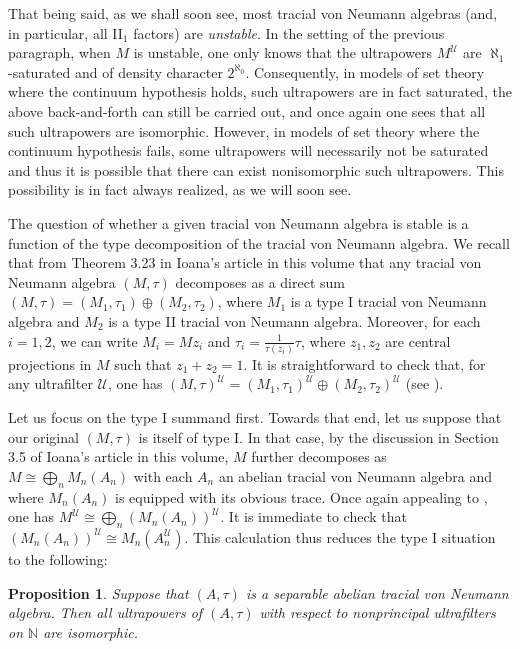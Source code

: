 \documentclass[12pt]{amsart}
\newtheorem{prop}[thm]{Proposition}
\theoremstyle{definition}
\def\bb{\mathbb}
\def\bb{\mathbb}
\def\u{\mathsf 1}
\def \u{\mathcal U}
\begin{document}
That being said, as we shall soon see, most tracial von Neumann algebras (and, in particular, all II$_1$ factors) are \emph{unstable}.   In the setting of the previous paragraph, when $M$ is unstable, one only knows that the ultrapowers $M^\u$ are $\aleph_1$-saturated and of density character $2^{\aleph_0}$.  Consequently, in models of set theory where the continuum hypothesis holds, such ultrapowers are in fact saturated, the above back-and-forth can still be carried out, and once again one sees that all such ultrapowers are isomorphic.  However, in models of set theory where the continuum hypothesis fails, some ultrapowers will necessarily not be saturated and thus it is possible that there can exist nonisomorphic such ultrapowers.  This possibility is in fact always realized, as we will soon see.

The question of whether a given tracial von Neumann algebra is stable is a function of the type decomposition of the tracial von Neumann algebra.  We recall that from Theorem 3.23 in Ioana's article in this volume that any tracial von Neumann algebra $(M,\tau)$ decomposes as a direct sum $(M,\tau)=(M_1,\tau_1)\oplus (M_2,\tau_2)$, where $M_1$ is a type I tracial von Neumann algebra and $M_2$ is a type II tracial von Neumann algebra.  Moreover, for each $i=1,2$, we can write $M_i=Mz_i$ and $\tau_i=\frac{1}{\tau(z_i)}\tau$, where $z_1,z_2$ are central projections in $M$ such that $z_1+z_2=1$.  It is straightforward to check that, for any ultrafilter $\u$, one has $(M,\tau)^\u=(M_1,\tau_1)^\u\oplus (M_2,\tau_2)^\u$ (see \cite[Lemma 4.1]{mtoa1}).

Let us focus on the type I summand first.  Towards that end, let us suppose that our original $(M,\tau)$ is itself of type I.  In that case, by the discussion in Section 3.5 of Ioana's article in this volume, $M$ further decomposes as $M\cong \bigoplus_n M_n(A_n)$ with each $A_n$ an abelian tracial von Neumann algebra and where $M_n(A_n)$ is equipped with its obvious trace.  Once again appealing to \cite[Lemma 4.1]{mtoa1}, one has $M^\u\cong \bigoplus_n (M_n(A_n))^\u$.  It is immediate to check that $(M_n(A_n))^\u \cong M_n(A_n^\u)$.  This calculation thus reduces the type I situation to the following:

\begin{prop}\label{abeliancase}
Suppose that $(A,\tau)$ is a separable abelian tracial von Neumann algebra.  Then all ultrapowers of $(A,\tau)$ with respect to nonprincipal ultrafilters on $\bb N$ are isomorphic.
\end{prop}
\end{document}
